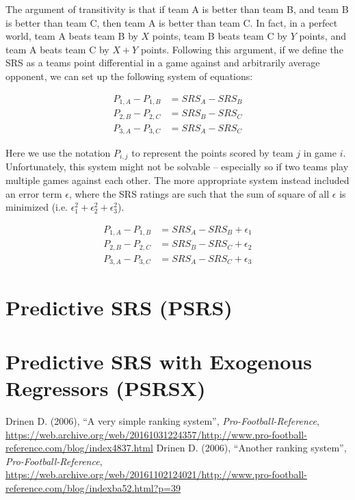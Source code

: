 \documentclass{report}
\begin{document}
The argument of transitivity is that if team A is better than team B, and team B is better than team C, then team A is better than team C.
In fact, in a perfect world, team A beats team B by $X$ points, team B beats team C by $Y$ points, and team A beats team C by $X+Y$ points.
Following this argument, if we define the SRS as a teams point differential in a game against and arbitrarily average opponent, we can set up the following system of equations:

\begin{equation}
    \begin{aligned}
        P_{1,A} - P_{1,B} &= SRS_A - SRS_B \\
        P_{2,B} - P_{2,C} &= SRS_B - SRS_C \\
        P_{3,A} - P_{3,C} &= SRS_A - SRS_C
    \end{aligned}
\end{equation}

Here we use the notation $P_{i,j}$ to represent the points scored by team $j$ in game $i$.
Unfortunately, this system might not be solvable -- especially so if two teams play multiple games against each other.
The more appropriate system instead included an error term $\epsilon$, where the SRS ratings are such that the sum of square of all $\epsilon$ is minimized (i.e. $\epsilon_1^2+\epsilon_2^2+\epsilon_3^2$).

\begin{equation}
    \begin{aligned}
        P_{1,A} - P_{1,B} &= SRS_A - SRS_B + \epsilon_1 \\
        P_{2,B} - P_{2,C} &= SRS_B - SRS_C + \epsilon_2 \\
        P_{3,A} - P_{3,C} &= SRS_A - SRS_C + \epsilon_3
    \end{aligned}
\end{equation}



\section{Predictive SRS (PSRS)}

\section{Predictive SRS with Exogenous Regressors (PSRSX)}

\begin{thebibliography}{9}
     Drinen D. (2006), ``A very simple ranking system'', \textit{Pro-Football-Reference}, \url{https://web.archive.org/web/20161031224357/http://www.pro-football-reference.com/blog/index4837.html}
     Drinen D. (2006), ``Another ranking system'', \textit{Pro-Football-Reference}, \url{https://web.archive.org/web/20161102124021/http://www.pro-football-reference.com/blog/indexba52.html?p=39}
\end{thebibliography}
\end{document}

